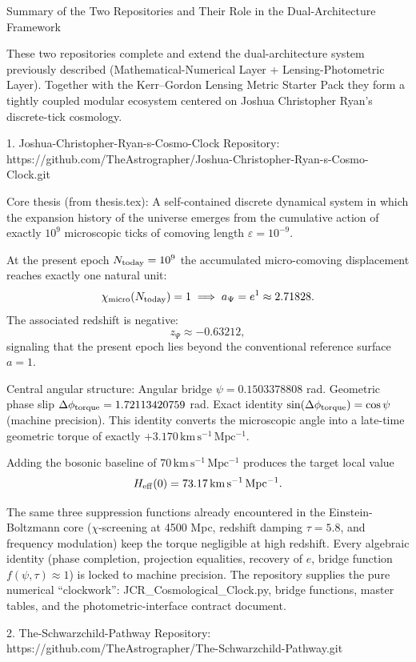 Summary of the Two Repositories and Their Role in the Dual-Architecture Framework

These two repositories complete and extend the dual-architecture system previously described (Mathematical-Numerical Layer + Lensing-Photometric Layer). Together with the Kerr–Gordon Lensing Metric Starter Pack they form a tightly coupled modular ecosystem centered on Joshua Christopher Ryan’s discrete-tick cosmology.

1. Joshua-Christopher-Ryan-s-Cosmo-Clock  
Repository: https://github.com/TheAstrographer/Joshua-Christopher-Ryan-s-Cosmo-Clock.git  

Core thesis (from thesis.tex):  
A self-contained discrete dynamical system in which the expansion history of the universe emerges from the cumulative action of exactly \(10^9\) microscopic ticks of comoving length \(\varepsilon = 10^{-9}\).  

At the present epoch \(N_{\rm today} = 10^9\) the accumulated micro-comoving displacement reaches exactly one natural unit:
\[
\chi_{\rm micro}(N_{\rm today}) = 1 \implies a_\Psi = e^{1} \approx 2.71828.
\]
The associated redshift is negative:
\[
z_\Psi \approx -0.63212,
\]
signaling that the present epoch lies beyond the conventional reference surface \(a=1\).

Central angular structure:
Angular bridge \(\psi = 0.1503378808\) rad.
Geometric phase slip \(\Delta\phi_{\rm torque} = 1.72113420759\) rad.
Exact identity \(\sin(\Delta\phi_{\rm torque}) = \cos\psi\) (machine precision).
This identity converts the microscopic angle into a late-time geometric torque of exactly \(+3.170\,\mathrm{km\,s^{-1}\,Mpc^{-1}}\).

Adding the bosonic baseline of \(70\,\mathrm{km\,s^{-1}\,Mpc^{-1}}\) produces the target local value
\[
H_{\rm eff}(0) = 73.17\,\mathrm{km\,s^{-1}\,Mpc^{-1}}.
\]

The same three suppression functions already encountered in the Einstein-Boltzmann core (\(\chi\)-screening at 4500 Mpc, redshift damping \(\tau=5.8\), and frequency modulation) keep the torque negligible at high redshift. Every algebraic identity (phase completion, projection equalities, recovery of \(e\), bridge function \(f(\psi,\tau)\approx 1\)) is locked to machine precision. The repository supplies the pure numerical “clockwork”: JCR_Cosmological_Clock.py, bridge functions, master tables, and the photometric-interface contract document.

2. The-Schwarzchild-Pathway  
Repository: https://github.com/TheAstrographer/The-Schwarzchild-Pathway.git  

